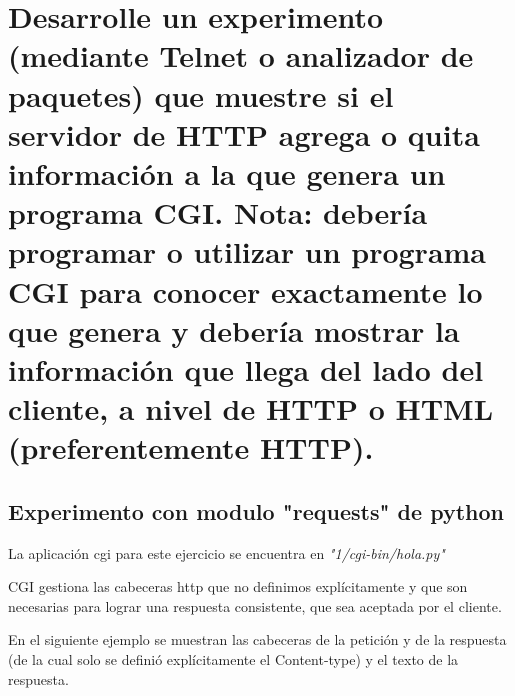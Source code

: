 \documentclass[12pt]{extarticle}
\begin{document}
    
    
    

\newpage
\tableofcontents
\newpage

    
    

    
    \section{Desarrolle un experimento (mediante Telnet o analizador de
paquetes) que muestre si el servidor de HTTP agrega o quita información
a la que genera un programa CGI. Nota: debería programar o utilizar un
programa CGI para conocer exactamente lo que genera y debería mostrar la
información que llega del lado del cliente, a nivel de HTTP o HTML
(preferentemente
HTTP).}\label{desarrolle-un-experimento-mediante-telnet-o-analizador-de-paquetes-que-muestre-si-el-servidor-de-http-agrega-o-quita-informaciuxf3n-a-la-que-genera-un-programa-cgi.-nota-deberuxeda-programar-o-utilizar-un-programa-cgi-para-conocer-exactamente-lo-que-genera-y-deberuxeda-mostrar-la-informaciuxf3n-que-llega-del-lado-del-cliente-a-nivel-de-http-o-html-preferentemente-http.}

    \subsection{Experimento con modulo "requests" de
python}\label{experimento-con-modulo-requests-de-python}

    La aplicación cgi para este ejercicio se encuentra en
\emph{"1/cgi-bin/hola.py"}

    CGI gestiona las cabeceras http que no definimos explícitamente y que
son necesarias para lograr una respuesta consistente, que sea aceptada
por el cliente.

En el siguiente ejemplo se muestran las cabeceras de la petición y de la
respuesta (de la cual solo se definió explícitamente el Content-type) y
el texto de la respuesta.
\end{document}
